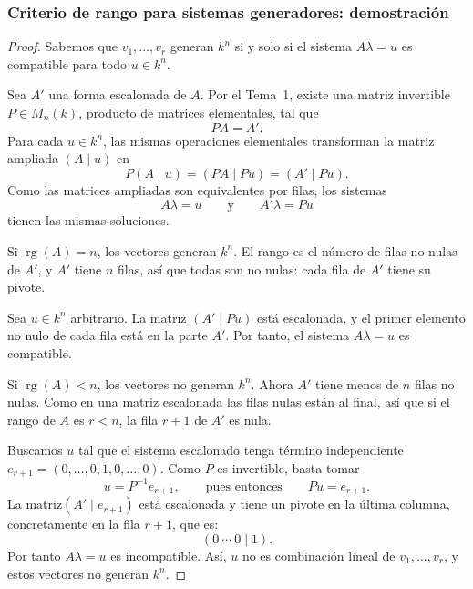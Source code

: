 \begin{frame}[allowframebreaks,t]
    \frametitle{Criterio de rango para sistemas generadores: demostración}

    \begin{proof}
        Sabemos que \(v_1,\ldots,v_r\) generan \(k^n\) si y solo si el sistema
        \(A\lambda=u\) es compatible para todo \(u\in k^n\).

        Sea \(A'\) una forma escalonada de \(A\). Por el Tema~1, existe una
        matriz invertible \(P\in M_n(k)\), producto de matrices elementales,
        tal que
        \[
            PA=A'.
        \]
        Para cada \(u\in k^n\), las mismas operaciones elementales
        transforman la matriz ampliada \((A\mid u)\) en
        \[
            P(A\mid u)=(PA\mid Pu)=(A'\mid Pu).
        \]
        Como las matrices ampliadas son equivalentes por filas, los sistemas
        \[
            A\lambda=u
            \qquad\text{y}\qquad
            A'\lambda=Pu
        \]
        tienen las mismas soluciones.

        \framebreak

        \alert{Si \(\operatorname{rg}(A)=n\), los vectores generan \(k^n\).}
        El rango es el número de filas no nulas de \(A'\), y \(A'\) tiene
        \(n\) filas, así que todas son no nulas: cada fila de \(A'\) tiene
        su pivote.

        Sea \(u\in k^n\) arbitrario. La matriz \((A'\mid Pu)\) está escalonada,
        y el primer elemento no nulo de cada fila está en la parte \(A'\).
        Por tanto, el sistema \(A\lambda=u\) es compatible.

        \framebreak

        \alert{Si \(\operatorname{rg}(A)<n\), los vectores no generan \(k^n\).}
        Ahora \(A'\) tiene menos de \(n\) filas no nulas. Como en una matriz
        escalonada las filas nulas están al final, así que si el rango de $A$ es $r<n$, la fila $r+1$ de $A'$ es nula.

        Buscamos \(u\) tal que el sistema escalonado tenga término
        independiente \(e_{r+1}=(0,\ldots,0,1, 0,\ldots,0)\). Como \(P\) es invertible,
        basta tomar
        \[
            u=P^{-1}e_{r+1},
            \qquad\text{pues entonces}\qquad
            Pu=e_{r+1}.
        \]
        La matriz\((A'\mid e_{r+1})\) está escalonada y tiene un pivote en la última columna, concretamente en la fila \(r+1\), que es:
        \[
            (0\ \cdots\ 0\mid 1).
        \]
        Por tanto \(A\lambda=u\)
        es incompatible. Así, \(u\) no es combinación lineal de \(v_1,\ldots,v_r\), y estos
        vectores no generan \(k^n\).
    \end{proof}
\end{frame}


